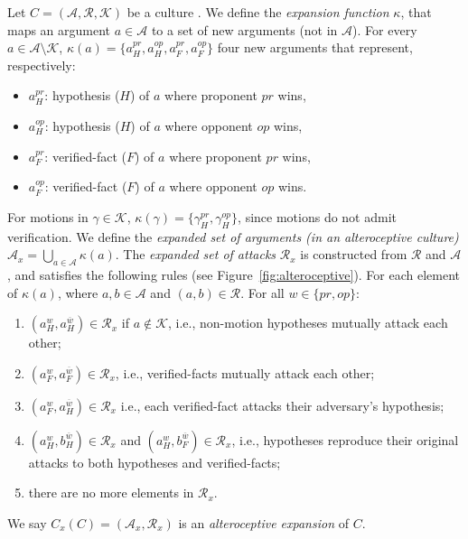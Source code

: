 \documentclass[acmsmall]{custom-arxiv}  %
\begin{document}
\begin{definition} 
\label{definition:alteroceptive}
Let $C = (\mathcal{A}, \mathcal{R}, \mathcal{K})$ be a culture%
. We define the \textit{expansion function} $\kappa$, that maps an argument $a \in \mathcal{A}$ to a set of new arguments (not in $\mathcal{A}$). For every $a \in \mathcal{A}\setminus\mathcal{K}$, $\kappa(a) = \{a_{H}^{pr}, a_{H}^{op}, a_{F}^{pr}, a_{F}^{op}\}$ four new arguments that represent, respectively:
\begin{itemize}
    \item $a_{H}^{pr}$: hypothesis ($H$) of $a$ where proponent $pr$ wins,
    \item $a_{H}^{op}$: hypothesis ($H$) of $a$ where opponent $op$ wins,
    \item $a_{F}^{pr}$: verified-fact ($F$) of $a$ where proponent $pr$ wins,
    \item $a_{F}^{op}$: verified-fact ($F$) of $a$ where opponent $op$ wins.
\end{itemize}
For motions in $\gamma \in \mathcal{K}$, $\kappa(\gamma) = \{\gamma_{H}^{pr}, \gamma_{H}^{op}\}$, since motions do not admit verification. We define the \textit{expanded set of arguments (in an alteroceptive culture)} $\mathcal{A}_x = \bigcup\limits_{a \in \mathcal{A}} \kappa(a)$. The \textit{expanded set of attacks} $\mathcal{R}_x$ is constructed from $\mathcal{R}$ and $\mathcal{A}$, and satisfies the following rules (see Figure~\ref{fig:alteroceptive}). For each element of $\kappa(a)$, where $a, b \in \mathcal{A}$ and $(a, b) \in \mathcal{R}$. For all $w \in \{pr, op\}$:
\begin{enumerate}
    \item $(a_{H}^{w}, a_{H}^{\overline{w}}) \in \mathcal{R}_x$ if $a \not \in \mathcal{K}$, i.e., non-motion hypotheses mutually attack each other;
    \item $(a_{F}^{w}, a_{F}^{\overline{w}}) \in \mathcal{R}_x$, i.e., verified-facts mutually attack each other; 
    \item $(a_{F}^{w}, a_{H}^{\overline{w}}) \in \mathcal{R}_x$  i.e., each verified-fact attacks their adversary's hypothesis;
    \item $(a_{H}^{w}, b_{H}^{\overline{w}}) \in \mathcal{R}_x$ and $(a_{H}^{w}, b_{F}^{\overline{w}}) \in \mathcal{R}_x$, i.e., hypotheses reproduce their original attacks to both hypotheses and verified-facts;  %
    \item there are no more elements in $\mathcal{R}_x$.
    \end{enumerate}

We say $C_x(C) = (\mathcal{A}_x, \mathcal{R}_x)$ is an \textit{alteroceptive expansion} of $C$. %
\end{definition}
\end{document}
